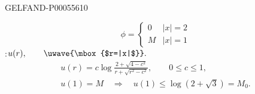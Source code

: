 \begin{GelfandAdjacentEvidence}{GELFAND-P000556}{10}

\[
\phi=\begin{cases}
0&|x|=2\\
M&|x|=1
\end{cases}
\]
:\quad \(u(r),\qquad \uwave{\mbox{$r=|x|$}}.\)
\begin{gather*}
u(r)=c\log\frac{2+\sqrt{4-c^2}}{r+\sqrt{r^2-c^2}},\qquad 0\le c\le1,\\
u(1)=M\quad\Rightarrow\quad u(1)\le\log(2+\sqrt3)=M_0.
\end{gather*}
\end{GelfandAdjacentEvidence}



